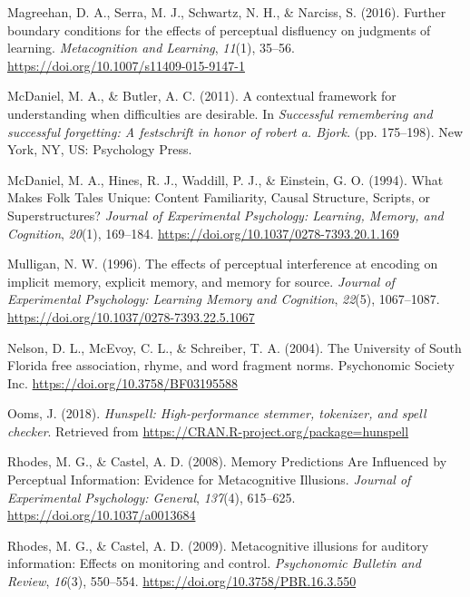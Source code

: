 \documentclass[english,doc]{apa6}
\begin{document}
\leavevmode\hypertarget{ref-Magreehan2016}{}%
Magreehan, D. A., Serra, M. J., Schwartz, N. H., \& Narciss, S. (2016). Further boundary conditions for the effects of perceptual disfluency on judgments of learning. \emph{Metacognition and Learning}, \emph{11}(1), 35--56. \url{https://doi.org/10.1007/s11409-015-9147-1}

\leavevmode\hypertarget{ref-McDaniel2011}{}%
McDaniel, M. A., \& Butler, A. C. (2011). A contextual framework for understanding when difficulties are desirable. In \emph{Successful remembering and successful forgetting: A festschrift in honor of robert a. Bjork.} (pp. 175--198). New York, NY, US: Psychology Press.

\leavevmode\hypertarget{ref-McDaniel1994}{}%
McDaniel, M. A., Hines, R. J., Waddill, P. J., \& Einstein, G. O. (1994). What Makes Folk Tales Unique: Content Familiarity, Causal Structure, Scripts, or Superstructures? \emph{Journal of Experimental Psychology: Learning, Memory, and Cognition}, \emph{20}(1), 169--184. \url{https://doi.org/10.1037/0278-7393.20.1.169}

\leavevmode\hypertarget{ref-Mulligan1996}{}%
Mulligan, N. W. (1996). The effects of perceptual interference at encoding on implicit memory, explicit memory, and memory for source. \emph{Journal of Experimental Psychology: Learning Memory and Cognition}, \emph{22}(5), 1067--1087. \url{https://doi.org/10.1037/0278-7393.22.5.1067}

\leavevmode\hypertarget{ref-Nelson2004}{}%
Nelson, D. L., McEvoy, C. L., \& Schreiber, T. A. (2004). The University of South Florida free association, rhyme, and word fragment norms. Psychonomic Society Inc. \url{https://doi.org/10.3758/BF03195588}

\leavevmode\hypertarget{ref-Ooms2018}{}%
Ooms, J. (2018). \emph{Hunspell: High-performance stemmer, tokenizer, and spell checker}. Retrieved from \url{https://CRAN.R-project.org/package=hunspell}

\leavevmode\hypertarget{ref-Rhodes2008}{}%
Rhodes, M. G., \& Castel, A. D. (2008). Memory Predictions Are Influenced by Perceptual Information: Evidence for Metacognitive Illusions. \emph{Journal of Experimental Psychology: General}, \emph{137}(4), 615--625. \url{https://doi.org/10.1037/a0013684}

\leavevmode\hypertarget{ref-Rhodes2009}{}%
Rhodes, M. G., \& Castel, A. D. (2009). Metacognitive illusions for auditory information: Effects on monitoring and control. \emph{Psychonomic Bulletin and Review}, \emph{16}(3), 550--554. \url{https://doi.org/10.3758/PBR.16.3.550}
\end{document}
